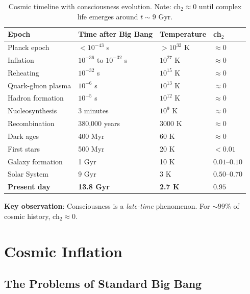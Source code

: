 \begin{level2}
\begin{table}[h]
\centering
\begin{tabular}{llll}
\toprule
\textbf{Epoch} & \textbf{Time after Big Bang} & \textbf{Temperature} & \textbf{ch$_2$} \\
\midrule
Planck epoch & $< 10^{-43}$ s & $> 10^{32}$ K & $\approx 0$ \\
Inflation & $10^{-36}$ to $10^{-32}$ s & $10^{27}$ K & $\approx 0$ \\
Reheating & $10^{-32}$ s & $10^{15}$ K & $\approx 0$ \\
Quark-gluon plasma & $10^{-6}$ s & $10^{13}$ K & $\approx 0$ \\
Hadron formation & $10^{-5}$ s & $10^{12}$ K & $\approx 0$ \\
Nucleosynthesis & 3 minutes & $10^9$ K & $\approx 0$ \\
Recombination & 380,000 years & 3000 K & $\approx 0$ \\
Dark ages & 400 Myr & 60 K & $\approx 0$ \\
First stars & 500 Myr & 20 K & $< 0.01$ \\
Galaxy formation & 1 Gyr & 10 K & $0.01\text{--}0.10$ \\
Solar System & 9 Gyr & 3 K & $0.50\text{--}0.70$ \\
\textbf{Present day} & \textbf{13.8 Gyr} & \textbf{2.7 K} & $\mathbf{0.95}$ \\
\bottomrule
\end{tabular}
\caption{Cosmic timeline with consciousness evolution. Note: ch$_2 \approx 0$ until complex life emerges around $t \sim 9$ Gyr.}
\label{tab:cosmic-timeline}
\end{table}

\textbf{Key observation}: Consciousness is a \textit{late-time} phenomenon. For $\sim 99\%$ of cosmic history, ch$_2 \approx 0$.
\end{level2}

\section{Cosmic Inflation}

\subsection{The Problems of Standard Big Bang}

